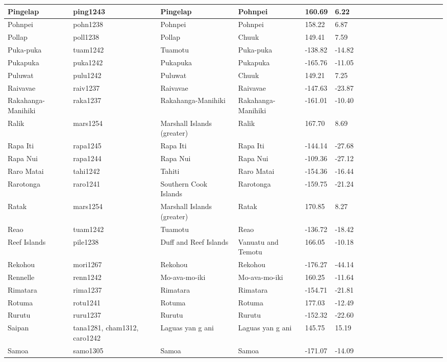 \documentclass[a4paper,10pt]{article} %
\begin{document}
\begin{landscape}
\begin{longtable}{| p{2.5cm} |  p{7cm} | p{2.5cm}  | p{2.5cm}  | p{2.5cm}  | p{2.5cm}  | p{2.5cm}  | p{2cm}  | p{1cm} | p{1cm}  | p{1cm} | p{1cm}  | p{1.5cm}  | p{1cm} | p{1cm}  | p{1cm}  |p{1cm}  | p{1cm}    |}
 Pingelap & ping1243 & Pingelap & Pohnpei & 160.69 & 6.22 \\ \hline
 Pohnpei & pohn1238 & Pohnpei & Pohnpei & 158.22 & 6.87 \\ \hline
 Pollap & poll1238 & Pollap & Chuuk & 149.41 & 7.59 \\ \hline
 Puka-puka & tuam1242 & Tuamotu & Puka-puka & -138.82 & -14.82 \\ \hline
 Pukapuka & puka1242 & Pukapuka & Pukapuka & -165.76 & -11.05 \\ \hline
 Puluwat & pulu1242 & Puluwat & Chuuk & 149.21 & 7.25 \\ \hline
 Raivavae & raiv1237 & Raivavae & Raivavae & -147.63 & -23.87 \\ \hline
 Rakahanga-Manihiki & raka1237 & Rakahanga-Manihiki & Rakahanga-Manihiki & -161.01 & -10.40 \\ \hline
 Ralik & mars1254 & Marshall Islands (greater) & Ralik & 167.70 & 8.69 \\ \hline
 Rapa Iti & rapa1245 & Rapa Iti & Rapa Iti & -144.14 & -27.68 \\ \hline
 Rapa Nui & rapa1244 & Rapa Nui & Rapa Nui & -109.36 & -27.12 \\ \hline
 Raro Matai & tahi1242 & Tahiti & Raro Matai & -154.36 & -16.44 \\ \hline
 Rarotonga & raro1241 & Southern Cook Islands & Rarotonga & -159.75 & -21.24 \\ \hline
 Ratak & mars1254 & Marshall Islands (greater) & Ratak & 170.85 & 8.27 \\ \hline
 Reao & tuam1242 & Tuamotu & Reao & -136.72 & -18.42 \\ \hline
 Reef Islands & pile1238 & Duff and Reef Islands & Vanuatu and Temotu & 166.05 & -10.18 \\ \hline
 Rekohou & mori1267 & Rekohou & Rekohou & -176.27 & -44.14 \\ \hline
 Rennelle & renn1242 & Mo-ava-mo-iki & Mo-ava-mo-iki & 160.25 & -11.64 \\ \hline
 Rimatara & rima1237 & Rimatara & Rimatara & -154.71 & -21.81 \\ \hline
 Rotuma & rotu1241 & Rotuma & Rotuma & 177.03 & -12.49 \\ \hline
 Rurutu & ruru1237 & Rurutu & Rurutu & -152.32 & -22.60 \\ \hline
 Saipan & tana1281,  cham1312,  caro1242 & Laguas yan g ani & Laguas yan g ani & 145.75 & 15.19 \\ \hline
 Samoa & samo1305 & Samoa & Samoa & -171.07 & -14.09 \\ \hline

\end{longtable}
\end{landscape}
\end{document}
